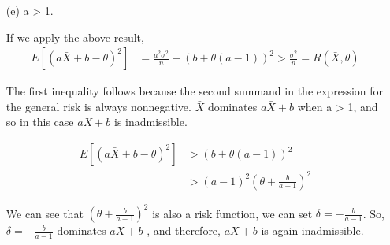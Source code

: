 \begin{Example}
\begin{itemize}
\item[(e)] a > 1.

If we apply the above result,
\begin{align*}
E[(a \bar{X} + b - \theta)^2] &= \frac{a^2 \sigma^2}{n} + (b + \theta(a -1))^2 > \frac{\sigma^2}{n} = R(\bar{X}, \theta)
\end{align*}

The first inequality follows because the second summand in the expression for the general risk is always nonnegative. $\bar{X}$ dominates $a \bar{X} + b$  when a > 1, and so in this case  $a \bar{X} + b$  is
inadmissible.

\begin{align*}
E[(a \bar{X} + b - \theta)^2] & > (b + \theta(a -1))^2 \\
&> (a-1)^2 (\theta + \frac{b}{a-1})^2
\end{align*}

We can see that $(\theta + \frac{b}{a-1})^2$ is also a risk function, we can set $\delta = -\frac{b}{a-1}$. So, $\delta = -\frac{b}{a-1}$ dominates $a \bar{X} + b$ ,
and therefore, $a \bar{X} + b$  is again inadmissible.

\end{itemize}

\end{Example}
